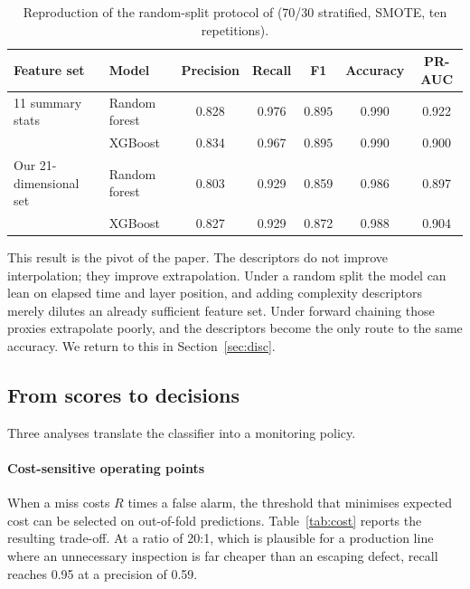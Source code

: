 \documentclass[preprint,12pt]{elsarticle}
\begin{document}
\begin{table}[t]
\centering
\small\setlength{\tabcolsep}{4pt}
\caption{Reproduction of the random-split protocol of \cite{ayyildizli2025} (70/30 stratified, SMOTE, ten repetitions).}
\footnotesize
\label{tab:icinco}
\begin{tabular}{llccccc}
\toprule
Feature set & Model & Precision & Recall & F1 & Accuracy & PR-AUC \\
\midrule
11 summary stats & Random forest & 0.828 & 0.976 & $\mathbf{0.895}$ & 0.990 & 0.922 \\
                          & XGBoost       & 0.834 & 0.967 & $\mathbf{0.895}$ & 0.990 & 0.900 \\
Our 21-dimensional set    & Random forest & 0.803 & 0.929 & 0.859 & 0.986 & 0.897 \\
                          & XGBoost       & 0.827 & 0.929 & 0.872 & 0.988 & 0.904 \\
\bottomrule
\end{tabular}
\end{table}

This result is the pivot of the paper. The descriptors do not improve interpolation; they improve extrapolation. Under a random split the model can lean on elapsed time and layer position, and adding complexity descriptors merely dilutes an already sufficient feature set. Under forward chaining those proxies extrapolate poorly, and the descriptors become the only route to the same accuracy. We return to this in Section~\ref{sec:disc}.

\subsection{From scores to decisions}

Three analyses translate the classifier into a monitoring policy.

\paragraph{Cost-sensitive operating points} When a miss costs $R$ times a false alarm, the threshold that minimises expected cost can be selected on out-of-fold predictions. Table~\ref{tab:cost} reports the resulting trade-off. At a ratio of 20:1, which is plausible for a production line where an unnecessary inspection is far cheaper than an escaping defect, recall reaches 0.95 at a precision of 0.59.
\end{document}
